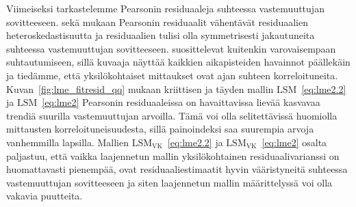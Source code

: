 \documentclass[finnish]{docopts}
\begin{document}
Viimeiseksi tarkastelemme Pearsonin residuaaleja suhteessa vastemuuttujan sovitteeseen. \cite{west14} sekä \cite{pinheiro00} mukaan Pearsonin residuaalit vähentävät residuaalien heteroskedastisuutta ja residuaalien tulisi olla symmetrisesti jakautuneita suhteessa vastemuuttujan sovitteeseen. \cite{burzykowski13} suosittelevat kuitenkin varovaisempaan suhtautumiseen, sillä kuvaaja näyttää kaikkien aikapisteiden havainnot päällekäin ja tiedämme, että yksilökohtaiset mittaukset ovat ajan suhteen korreloituneita.\\

Kuvan~\ref{fig:lme_fitresid_qq} mukaan kriittisen ja täyden mallin  $\text{LSM}$~\ref{eq:lme2.2} ja  $\text{LSM}$~\ref{eq:lme2} Pearsonin residuaaleissa on havaittavissa lievää kasvavaa trendiä suurilla vastemuuttujan arvoilla. Tämä voi olla selitettävissä \cite{burzykowski13} huomiolla mittausten korreloituneisuudesta, sillä painoindeksi saa suurempia arvoja vanhemmilla lapsilla. Mallien $\text{LSM}_{\text{VK}}$~\ref{eq:lme2.2} ja $\text{LSM}_{\text{VK}}$~\ref{eq:lme2} osalta paljastuu, että vaikka laajennetun mallin yksilökohtainen residuaalivarianssi on huomattavasti pienempää, ovat residuaaliestimaatit hyvin vääristyneitä suhteessa vastemuuttujan sovitteeseen ja siten laajennetun mallin määrittelyssä voi olla vakavia puutteita.\\
\end{document}
